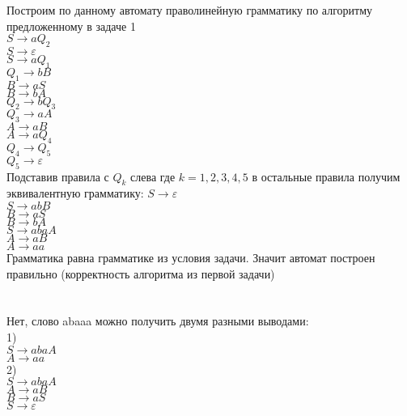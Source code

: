 \documentclass[a4paper,12pt]{article}
\begin{document}
Построим по данному автомату праволинейную грамматику по алгоритму предложенному в задаче 1\\
$S\rightarrow aQ_2$\\
$S\rightarrow \varepsilon$\\
$S\rightarrow aQ_1$\\
$Q_1\rightarrow bB$\\
$B\rightarrow aS$\\
$B\rightarrow bA$\\
$Q_2\rightarrow bQ_3$\\
$Q_3\rightarrow aA$\\
$A\rightarrow aB$\\
$A\rightarrow aQ_4$\\
$Q_4\rightarrow Q_5$\\
$Q_5\rightarrow \varepsilon$\\
Подставив правила с $Q_k$ слева где $k = 1, 2, 3, 4, 5$ в остальные правила получим эквивалентную грамматику:
$S\rightarrow \varepsilon$\\
$S\rightarrow abB$\\
$B\rightarrow aS$\\
$B\rightarrow bA$\\
$S\rightarrow abaA$\\
$A\rightarrow aB$\\
$A\rightarrow aa$\\
Грамматика равна грамматике из условия задачи. Значит автомат построен правильно (корректность алгоритма из первой задачи)
\section{}
Нет, слово abaaa можно получить двумя разными выводами:\\
1)\\
$S\rightarrow abaA$\\
$A\rightarrow aa$\\
2)\\
$S\rightarrow abaA$\\
$A\rightarrow aB$\\
$B\rightarrow aS$\\
$S\rightarrow \varepsilon$\\
\section{}
\end{document}
